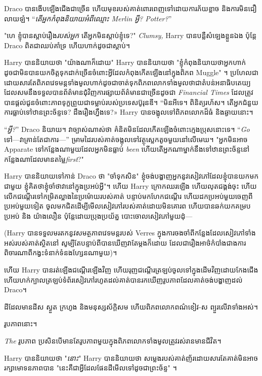 Draco បាន​ងើប​ឡើង​ជើង​ជា​ច្រើន ហើយ​មុខ​របស់​គាត់​ពោរពេញ​ទៅ​ដោយ​ការ​ភ័យ​ខ្លាច និង​ការ​មិន​ជឿ​លាយ​ឡំ។ “\emph{តើអ្នកកំពុងនិយាយអំពីឈ្មោះ Merlin អ្វី? Potter?}”

"ហេ ខ្ញុំបានស្តាប់រឿង\emph{របស់អ្នក} តើអ្នកមិនស្តាប់ខ្ញុំទេ?" \emph{Clumsy,} Harry បានបន្លឺសំឡេងខ្លួនឯង ប៉ុន្តែ Draco ពិតជាឈប់គាំទ្រ ហើយហាក់ដូចជាស្តាប់។

Harry បាននិយាយថា "យ៉ាងណាក៏ដោយ" Harry បាននិយាយថា "ខ្ញុំកំពុងនិយាយថាអ្នកហាក់ដូចជាមិនបានយកចិត្តទុកដាក់ច្រើនចំពោះអ្វីដែលកំពុងកើតឡើងនៅក្នុងពិភព Muggle" ។ ប្រហែលជាដោយសារតែពិភពវេទមន្តទាំងមូលហាក់ដូចជាចាត់ទុកពិភពលោកទាំងមូលថាជាតំបន់អនាធិបតេយ្យ ដែលសមនឹងទទួលបានព័ត៌មានជុំវិញការផ្សាយព័ត៌មានជាច្រើនដូចជា \emph{Financial Times} ដែលត្រូវបានផ្តល់ជូនចំពោះភាពទុក្ខព្រួយជាទម្លាប់របស់ប្រទេសប៊ូរុនឌី។ “មិនអីទេ។ ពិនិត្យរហ័ស។ តើអ្នកជំនួយការធ្លាប់ទៅឋានព្រះច័ន្ទទេ? ដឹងរឿងហ្នឹងទេ?» Harry បានចង្អុលទៅពិភពលោកដ៏ធំ និងឆ្ងាយនោះ។

“\emph{អ្វី?}” Draco និយាយ។ វាច្បាស់ណាស់ថា គំនិតមិនដែលកើតឡើងចំពោះក្មេងប្រុសនោះទេ។ “\emph{Go} ទៅ—វាគ្រាន់តែជាការ—” ម្រាមដៃរបស់គាត់ចង្អុលទៅវត្ថុស្លេកតូចមួយនៅលើមេឃ។ "អ្នកមិនអាច Apparate ទៅកន្លែងណាមួយដែលអ្នកមិនធ្លាប់ \emph{been} ហើយតើអ្នកណាម្នាក់នឹងទៅឋានព្រះច័ន្ទនៅកន្លែងណាដែលមានតម្លៃ\emph{first}?"

Harry បាននិយាយទៅកាន់ Draco ថា "ចាំទុកសិន" ខ្ញុំចង់បង្ហាញអ្នកនូវសៀវភៅដែលខ្ញុំបានយកមកជាមួយ ខ្ញុំគិតថាខ្ញុំចាំថាវានៅក្នុងប្រអប់អ្វី"។ ហើយ Harry ក្រោកឈរឡើង ហើយលុតជង្គង់ចុះ ហើយលើកជណ្តើរទៅកម្រិតល្អាងនៃប្រម៉ោយរបស់គាត់ បន្ទាប់មកហែកជណ្តើរ ហើយដកប្រអប់មួយចេញពីប្រអប់មួយទៀត ចូលមកជិតដើម្បីមើលសៀវភៅរបស់គាត់ដោយមិនគោរព ហើយបានឆក់យកគម្របប្រអប់ និង យ៉ាងលឿន ប៉ុន្តែដោយប្រុងប្រយ័ត្ន បោះចោលសៀវភៅមួយដុំ—

(Harry បានទទួលមរតកនូវសមត្ថភាពវេទមន្តរបស់ Verres ក្នុងការចងចាំពីកន្លែងដែលសៀវភៅទាំងអស់របស់គាត់ស្ថិតនៅ សូម្បីតែបន្ទាប់ពីបានឃើញវាតែម្តងក៏ដោយ ដែលជារឿងអាថ៌កំបាំងជាងការពិចារណាពីកង្វះទំនាក់ទំនងហ្សែនណាមួយ)។

ហើយ Harry បាន​រត់​ឡើង​ជណ្តើរ​ឡើង​វិញ ហើយ​រុញ​ជណ្ដើរ​ត្រឡប់​ចូល​ទៅ​ក្នុង​ដើម​វិញ​ដោយ​កែងជើង ហើយ​ហក់​ក្បាល​ត្រឡប់​ទំព័រ​សៀវភៅ​រហូត​ដល់​គាត់​បាន​រក​ឃើញ​រូបភាព​ដែល​គាត់​ចង់​បង្ហាញ​ដល់ Draco។

ដីដែលមានដីស ស្ងួត ក្រហូង និងមនុស្សស័ក្តិសម ហើយពិភពលោកពណ៌ខៀវ-ស ព្យួរលើវាទាំងអស់។

រូបភាពនោះ។

\emph{The} រូបភាព ប្រសិនបើមានតែរូបភាពមួយក្នុងពិភពលោកទាំងមូលត្រូវរស់រានមានជីវិត។

Harry បាននិយាយថា "\emph{នោះ}" Harry បាននិយាយថា សម្លេងរបស់គាត់ញ័រដោយសារតែគាត់មិនអាចរក្សាមោទនភាពបាន "នេះគឺជាអ្វីដែលផែនដីមើលទៅដូចជាព្រះច័ន្ទ" ។

